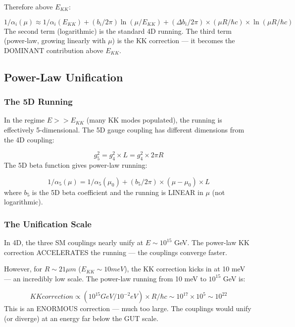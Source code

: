 \documentclass[aps,prd,preprint,superscriptaddress,longbibliography,floatfix]{revtex4-2}
\theoremstyle{remark}
\begin{document}
Therefore above $E_{KK}$:


\begin{equation}
    1/\alpha_{i}(\mu) \approx 1/\alpha_{i}(E_{KK}) + (b_{i}/2\pi) \ln(\mu/E_{KK}) + (\Delta b_{i}/2\pi) \times (\mu R/\hbar c) \times \ln(\mu R/\hbar c)
\end{equation}
The second term (logarithmic) is the standard 4D running. The third term (power-law, growing linearly with $\mu$) is the KK correction --- it becomes the DOMINANT contribution above $E_{KK}$.



\subsection{Power-Law Unification}


\subsubsection{The 5D Running}

In the regime $E >> E_{KK}$ (many KK modes populated), the running is effectively 5-dimensional. The 5D gauge coupling has different dimensions from the 4D coupling:


\begin{equation}
    g_{5}^{2} = g_{4}^{2} \times L = g_{4}^{2} \times 2\pi R
\end{equation}
The 5D beta function gives power-law running:


\begin{equation}
    1/\alpha_{5}(\mu) = 1/\alpha_{5}(\mu_{0}) + (b_{5}/2\pi) \times (\mu - \mu_{0}) \times L
\end{equation}
where $b_{5}$ is the 5D beta coefficient and the running is LINEAR in $\mu$ (not logarithmic).


\subsubsection{The Unification Scale}

In 4D, the three SM couplings nearly unify at $E \sim  10^{15}$ GeV. The power-law KK correction ACCELERATES the running --- the couplings converge faster.

However, for $R \sim  21 \mu m$ ($E_{KK} \sim  10 meV$), the KK correction kicks in at 10 meV --- an incredibly low scale. The power-law running from 10 meV to $10^{15}$ GeV is:


\begin{equation}
    KK correction \propto (10^{15} GeV / 10^{-2} eV) \times R/\hbar c \sim  10^{17} \times 10^{5} \sim  10^{22}
\end{equation}
This is an ENORMOUS correction --- much too large. The couplings would unify (or diverge) at an energy far below the GUT scale.
\end{document}
